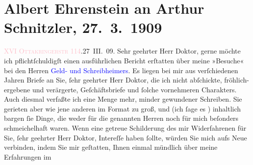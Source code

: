 

               \section[Albert Ehrenstein an Arthur Schnitzler, 27. 3. 1909]{ Albert Ehrenstein an Arthur Schnitzler, 27. 3. 1909}\nopagebreak{}\rehead{ }\normalsize\beginnumbering{} \toendnotes[C]{\smallbreak\pagebreak[2]} 
\toendnotes[C]{\smallbreak}\pstart
           {\pb}\textcolor{pink}{XVI \textsc{Ottakringerstr}
                        114}{}\ledrightnote{\textcolor{pink}{Ottakringerstraße}}.\hfill 27 III. 09.\pend
           \pstart{}Sehr geehrter Herr Doktor,\pend\pstart
           gerne möchte ich pflichtſchuldigſt einen ausführlichen Bericht erſtatten über meine
               »Besuche« bei den Herren \textcolor{blue}{Geld-
                  und Schreibheimers}{}. Es liegen bei mir aus verſchiedenen Jahren Briefe an Sie,
               ſehr geehrter Herr Doktor, die ich nicht abſchickte, fröhlich-ergebene und
               verärgerte, Geſchäftsbriefe und ſolche vornehmeren Charakters. Auch diesmal verfaßte
               ich eine Menge mehr, minder gewundener Schreiben. Sie gerieten aber wie jene anderen
               im Format zu groß, und (ich ſage es \label{K_L01835_1v}\label{K_L01835_1h}) {\pb}inhaltlich
               bargen ſie Dinge, die weder für die genannten Herren noch für mich beſonders
               schmeichelhaft waren. Wenn eine getreue Schilderung des mir Widerfahrenen für Sie,
               ſehr geehrter Herr Doktor, Intereſſe haben ſollte, würden Sie mich aufs Neue
               verbinden, indem Sie mir geſtatten, Ihnen einmal mündlich über meine Erfahrungen im
